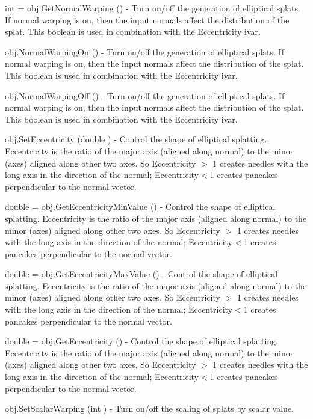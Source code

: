 \begin{DoxyItemize}
\item {\ttfamily int = obj.\-Get\-Normal\-Warping ()} -\/ Turn on/off the generation of elliptical splats. If normal warping is on, then the input normals affect the distribution of the splat. This boolean is used in combination with the Eccentricity ivar.  
\item {\ttfamily obj.\-Normal\-Warping\-On ()} -\/ Turn on/off the generation of elliptical splats. If normal warping is on, then the input normals affect the distribution of the splat. This boolean is used in combination with the Eccentricity ivar.  
\item {\ttfamily obj.\-Normal\-Warping\-Off ()} -\/ Turn on/off the generation of elliptical splats. If normal warping is on, then the input normals affect the distribution of the splat. This boolean is used in combination with the Eccentricity ivar.  
\item {\ttfamily obj.\-Set\-Eccentricity (double )} -\/ Control the shape of elliptical splatting. Eccentricity is the ratio of the major axis (aligned along normal) to the minor (axes) aligned along other two axes. So Eccentricity $>$ 1 creates needles with the long axis in the direction of the normal; Eccentricity$<$1 creates pancakes perpendicular to the normal vector.  
\item {\ttfamily double = obj.\-Get\-Eccentricity\-Min\-Value ()} -\/ Control the shape of elliptical splatting. Eccentricity is the ratio of the major axis (aligned along normal) to the minor (axes) aligned along other two axes. So Eccentricity $>$ 1 creates needles with the long axis in the direction of the normal; Eccentricity$<$1 creates pancakes perpendicular to the normal vector.  
\item {\ttfamily double = obj.\-Get\-Eccentricity\-Max\-Value ()} -\/ Control the shape of elliptical splatting. Eccentricity is the ratio of the major axis (aligned along normal) to the minor (axes) aligned along other two axes. So Eccentricity $>$ 1 creates needles with the long axis in the direction of the normal; Eccentricity$<$1 creates pancakes perpendicular to the normal vector.  
\item {\ttfamily double = obj.\-Get\-Eccentricity ()} -\/ Control the shape of elliptical splatting. Eccentricity is the ratio of the major axis (aligned along normal) to the minor (axes) aligned along other two axes. So Eccentricity $>$ 1 creates needles with the long axis in the direction of the normal; Eccentricity$<$1 creates pancakes perpendicular to the normal vector.  
\item {\ttfamily obj.\-Set\-Scalar\-Warping (int )} -\/ Turn on/off the scaling of splats by scalar value.  

\end{DoxyItemize}
